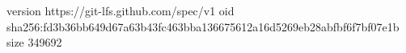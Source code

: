 version https://git-lfs.github.com/spec/v1
oid sha256:fd3b36bb649d67a63b43fc463bba136675612a16d5269eb28abfbf6f7bf07e1b
size 349692

